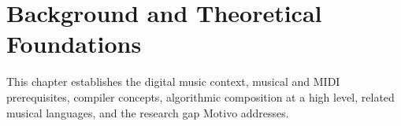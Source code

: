 \chapter{Background and Theoretical Foundations}\label{ch:background}

This chapter establishes the digital music context, musical and MIDI prerequisites, compiler concepts, algorithmic
composition at a high level, related musical languages, and the research gap Motivo addresses.








